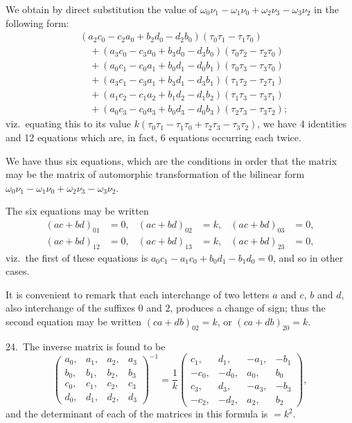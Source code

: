 \documentclass[11pt,a4paper]{article}
\theoremstyle{definition}
\begin{document}
We obtain by direct substitution the value of $\omega_0\nu_1 - \omega_1\nu_0 + \omega_2\nu_3 - \omega_3\nu_2$ in the following form:
\begin{align*}
&(a_2c_0 - c_2a_0 + b_2d_0 - d_2b_0)(\tau_0\tau_1 - \tau_1\tau_0)\\
&\quad + (a_3c_0 - c_3a_0 + b_3d_0 - d_3b_0)(\tau_0\tau_2 - \tau_2\tau_0)\\
&\quad + (a_0c_1 - c_0a_1 + b_0d_1 - d_0b_1)(\tau_0\tau_3 - \tau_3\tau_0)\\
&\quad + (a_3c_1 - c_3a_1 + b_3d_1 - d_3b_1)(\tau_1\tau_2 - \tau_2\tau_1)\\
&\quad + (a_1c_2 - c_1a_2 + b_1d_2 - d_1b_2)(\tau_1\tau_3 - \tau_3\tau_1)\\
&\quad + (a_0c_3 - c_0a_3 + b_0d_3 - d_0b_3)(\tau_2\tau_3 - \tau_3\tau_2);
\end{align*}
viz.\ equating this to its value $k(\tau_0\tau_1 - \tau_1\tau_0 + \tau_2\tau_3 - \tau_3\tau_2)$, we have 4 identities and 12 equations which are, in fact, 6 equations occurring each twice.

We have thus six equations, which are the conditions in order that the matrix may be the matrix of automorphic transformation of the bilinear form $\omega_0\nu_1 - \omega_1\nu_0 + \omega_2\nu_3 - \omega_3\nu_2$.

The six equations may be written
\begin{align*}
(ac + bd)_{01} &= 0, & (ac + bd)_{02} &= k, & (ac + bd)_{03} &= 0,\\
(ac + bd)_{12} &= 0, & (ac + bd)_{13} &= k, & (ac + bd)_{23} &= 0,
\end{align*}
viz.\ the first of these equations is $a_0c_1 - a_1c_0 + b_0d_1 - b_1d_0 = 0$, and so in other cases.

It is convenient to remark that each interchange of two letters $a$ and $c$, $b$ and $d$, also interchange of the suffixes $0$ and $2$, produces a change of sign; thus the second equation may be written $(ca + db)_{02} = k$, or $(ca + db)_{20} = k$.

\medskip

24.\ The inverse matrix is found to be
\[
\begin{pmatrix}
a_0, & a_1, & a_2, & a_3\\
b_0, & b_1, & b_2, & b_3\\
c_0, & c_1, & c_2, & c_3\\
d_0, & d_1, & d_2, & d_3
\end{pmatrix}^{-1}
= \frac{1}{k}
\begin{pmatrix}
c_1, & d_1, & -a_1, & -b_1\\
-c_0, & -d_0, & a_0, & b_0\\
c_3, & d_3, & -a_3, & -b_3\\
-c_2, & -d_2, & a_2, & b_2
\end{pmatrix},
\]
and the determinant of each of the matrices in this formula is $= k^2$.
\end{document}
